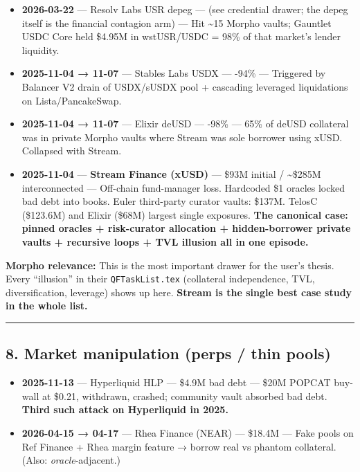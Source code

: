 \begin{itemize}
\tightlist
\item
  \textbf{2026-03-22} --- Resolv Labs USR depeg --- (see credential drawer; the depeg itself is the financial contagion arm) --- Hit \textasciitilde15 Morpho vaults; Gauntlet USDC Core held \$4.95M in wstUSR/USDC = 98\% of that market's lender liquidity.
\item
  \textbf{2025-11-04 → 11-07} --- Stables Labs USDX --- -94\% --- Triggered by Balancer V2 drain of USDX/sUSDX pool + cascading leveraged liquidations on Lista/PancakeSwap.
\item
  \textbf{2025-11-04 → 11-07} --- Elixir deUSD --- -98\% --- 65\% of deUSD collateral was in private Morpho vaults where Stream was sole borrower using xUSD. Collapsed with Stream.
\item
  \textbf{2025-11-04} --- \textbf{Stream Finance (xUSD)} --- \$93M initial / \textasciitilde\$285M interconnected --- Off-chain fund-manager loss. Hardcoded \$1 oracles locked bad debt into books. Euler third-party curator vaults: \$137M. TelosC (\$123.6M) and Elixir (\$68M) largest single exposures. \textbf{The canonical case: pinned oracles + risk-curator allocation + hidden-borrower private vaults + recursive loops + TVL illusion all in one episode.}
\end{itemize}

\textbf{Morpho relevance:} This is the most important drawer for the user's thesis. Every ``illusion'' in their \texttt{QFTaskList.tex} (collateral independence, TVL, diversification, leverage) shows up here. \textbf{Stream is the single best case study in the whole list.}

\begin{center}\rule{0.5\linewidth}{0.5pt}\end{center}

\subsection{8. Market manipulation (perps / thin pools)}\label{market-manipulation-perps-thin-pools}

\begin{itemize}
\tightlist
\item
  \textbf{2025-11-13} --- Hyperliquid HLP --- \$4.9M bad debt --- \$20M POPCAT buy-wall at \$0.21, withdrawn, crashed; community vault absorbed bad debt. \textbf{Third such attack on Hyperliquid in 2025.}
\item
  \textbf{2026-04-15 → 04-17} --- Rhea Finance (NEAR) --- \$18.4M --- Fake pools on Ref Finance + Rhea margin feature → borrow real vs phantom collateral. (Also: \emph{oracle}-adjacent.)
\end{itemize}


